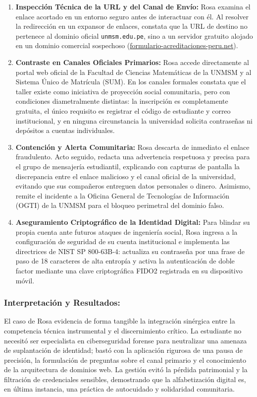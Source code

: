 \begin{enumerate}
    \item \textbf{Inspección Técnica de la URL y del Canal de Envío:} Rosa examina el enlace acortado en un entorno seguro antes de interactuar con él. Al resolver la redirección en un expansor de enlaces, constata que la URL de destino no pertenece al dominio oficial \texttt{unmsm.edu.pe}, sino a un servidor gratuito alojado en un dominio comercial sospechoso (\url{formulario-acreditaciones-peru.net}).
    \item \textbf{Contraste en Canales Oficiales Primarios:} Rosa accede directamente al portal web oficial de la Facultad de Ciencias Matemáticas de la UNMSM y al Sistema Único de Matrícula (SUM). En los canales formales constata que el taller existe como iniciativa de proyección social comunitaria, pero con condiciones diametralmente distintas: la inscripción es completamente gratuita, el único requisito es registrar el código de estudiante y correo institucional, y en ninguna circunstancia la universidad solicita contraseñas ni depósitos a cuentas individuales.
    \item \textbf{Contención y Alerta Comunitaria:} Rosa descarta de inmediato el enlace fraudulento. Acto seguido, redacta una advertencia respetuosa y precisa para el grupo de mensajería estudiantil, explicando con capturas de pantalla la discrepancia entre el enlace malicioso y el canal oficial de la universidad, evitando que sus compañeros entreguen datos personales o dinero. Asimismo, remite el incidente a la Oficina General de Tecnologías de Información (OGTI) de la UNMSM para el bloqueo perimetral del dominio falso.
    \item \textbf{Aseguramiento Criptográfico de la Identidad Digital:} Para blindar su propia cuenta ante futuros ataques de ingeniería social, Rosa ingresa a la configuración de seguridad de su cuenta institucional e implementa las directrices de NIST SP 800-63B-4: actualiza su contraseña por una frase de paso de 18 caracteres de alta entropía y activa la autenticación de doble factor mediante una clave criptográfica FIDO2 registrada en su dispositivo móvil.
\end{enumerate}

\subsubsection*{Interpretación y Resultados:}
El caso de Rosa evidencia de forma tangible la integración sinérgica entre la competencia técnica instrumental y el discernimiento crítico. La estudiante no necesitó ser especialista en ciberseguridad forense para neutralizar una amenaza de suplantación de identidad; bastó con la aplicación rigurosa de una pausa de precisión, la formulación de preguntas sobre el canal primario y el conocimiento de la arquitectura de dominios web. La gestión evitó la pérdida patrimonial y la filtración de credenciales sensibles, demostrando que la alfabetización digital es, en última instancia, una práctica de autocuidado y solidaridad comunitaria.

